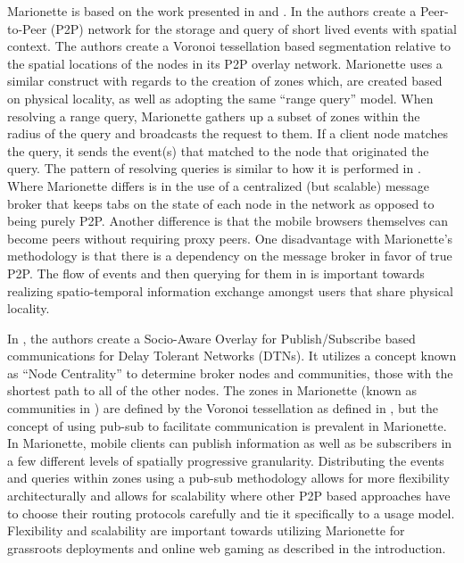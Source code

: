 \documentclass[12pt]{report}	%
\theoremstyle{definition}
\theoremstyle{remark}
\begin{document}
Marionette is based on the work presented in
\cite{zio2011p2p} and
\cite{yoneki2007socio}. In
\cite{zio2011p2p} the authors create a Peer-to-Peer
(P2P) network for the storage and query of short lived events with
spatial context. The authors create a Voronoi tessellation based
segmentation relative to the spatial locations of the nodes in its P2P
overlay network. Marionette uses a similar construct with regards to the
creation of zones which, are created based on physical locality, as well
as adopting the same ``range query'' model. When resolving a range query,
Marionette gathers up a subset of zones within the radius of the query
and broadcasts the request to them. If a client node matches the query,
it sends the event(s) that matched to the node that originated the
query. The pattern of resolving queries is similar to how it is
performed in \cite{zio2011p2p}. Where Marionette
differs is in the use of a centralized (but scalable) message broker
that keeps tabs on the state of each node in the network as opposed to
being purely P2P. Another difference is that the mobile browsers
themselves can become peers without requiring proxy peers.
One disadvantage with Marionette's methodology is that there is a
dependency on the message broker in favor of true P2P. The flow of
events and then querying for them in \cite{zio2011p2p}
is important towards realizing spatio-temporal information exchange
amongst users that share physical locality.

In \cite{yoneki2007socio}, the authors create a
Socio-Aware Overlay for Publish/Subscribe based communications for Delay
Tolerant Networks (DTNs). It utilizes a concept known as ``Node
Centrality'' to determine broker nodes and communities, those with the
shortest path to all of the other nodes. The zones in Marionette (known
as communities in \cite{yoneki2007socio}) are defined
by the Voronoi tessellation as defined in
\cite{zio2011p2p}, but the concept of using pub-sub to
facilitate communication is prevalent in Marionette. In Marionette, mobile
clients can publish information as well as be subscribers in a few
different levels of spatially progressive granularity. Distributing the
events and queries within zones using a pub-sub methodology allows for
more flexibility architecturally and allows for scalability where other
P2P based approaches have to choose their routing protocols carefully
and tie it specifically to a usage model. Flexibility and
scalability are important towards utilizing Marionette for grassroots
deployments and online web gaming as described in the introduction.
\end{document}
